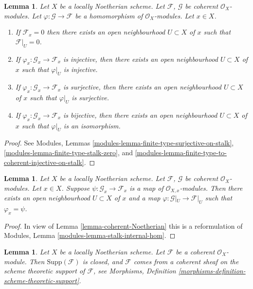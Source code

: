 \documentclass{stacks-project}
\theoremstyle{plain}
\newtheorem{lemma}[subsection]{Lemma}
\theoremstyle{definition}
\theoremstyle{remark}
\numberwithin{equation}{subsection}
\begin{document}
\begin{lemma}
\label{lemma-local-isomorphism}
Let $X$ be a locally Noetherian scheme.
Let $\mathcal{F}$, $\mathcal{G}$ be coherent $\mathcal{O}_X$-modules.
Let $\varphi : \mathcal{G} \to \mathcal{F}$ be a homomorphism
of $\mathcal{O}_X$-modules. Let $x \in X$.
\begin{enumerate}
\item If $\mathcal{F}_x = 0$ then there exists an open neighbourhood
$U \subset X$ of $x$ such that $\mathcal{F}|_U = 0$.
\item If $\varphi_x : \mathcal{G}_x \to \mathcal{F}_x$ is injective,
then there exists an open neighbourhood $U \subset X$ of $x$ such that
$\varphi|_U$ is injective.
\item If $\varphi_x : \mathcal{G}_x \to \mathcal{F}_x$ is surjective,
then there exists an open neighbourhood $U \subset X$ of $x$ such that
$\varphi|_U$ is surjective.
\item If $\varphi_x : \mathcal{G}_x \to \mathcal{F}_x$ is bijective,
then there exists an open neighbourhood $U \subset X$ of $x$ such that
$\varphi|_U$ is an isomorphism.
\end{enumerate}
\end{lemma}

\begin{proof}
See Modules, Lemmas
\ref{modules-lemma-finite-type-surjective-on-stalk},
\ref{modules-lemma-finite-type-stalk-zero}, and
\ref{modules-lemma-finite-type-to-coherent-injective-on-stalk}.
\end{proof}

\begin{lemma}
\label{lemma-map-stalks-local-map}
Let $X$ be a locally Noetherian scheme.
Let $\mathcal{F}$, $\mathcal{G}$ be coherent $\mathcal{O}_X$-modules.
Let $x \in X$.
Suppose $\psi : \mathcal{G}_x \to \mathcal{F}_x$ is a map of
$\mathcal{O}_{X, x}$-modules.
Then there exists an open neighbourhood $U \subset X$ of $x$ and a map
$\varphi : \mathcal{G}|_U \to \mathcal{F}|_U$ such that
$\varphi_x = \psi$.
\end{lemma}

\begin{proof}
In view of Lemma \ref{lemma-coherent-Noetherian}
this is a reformulation of
Modules, Lemma \ref{modules-lemma-stalk-internal-hom}.
\end{proof}

\begin{lemma}
\label{lemma-coherent-support-closed}
Let $X$ be a locally Noetherian scheme. Let $\mathcal{F}$ be a coherent
$\mathcal{O}_X$-module. Then $\text{Supp}(\mathcal{F})$ is closed, and
$\mathcal{F}$ comes from a coherent sheaf on the scheme theoretic support
of $\mathcal{F}$, see
Morphisms, Definition \ref{morphisms-definition-scheme-theoretic-support}.
\end{lemma}
\end{document}
